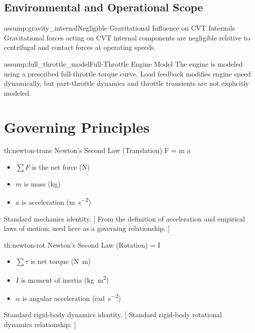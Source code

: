 \documentclass[11pt]{article}
\numberwithin{equation}{section}
\newcounter{theory}
\newcounter{assump}
\begin{document}
\subsection{Environmental and Operational Scope}

\begin{assumptionblock}{assump:gravity_internal}{Negligible Gravitational Influence on CVT Internals}
Gravitational forces acting on CVT internal components
are negligible relative to centrifugal and contact forces
at operating speeds.
\end{assumptionblock}

\begin{assumptionblock}{assump:full_throttle_model}{Full-Throttle Engine Model}
The engine is modeled using a prescribed full-throttle torque curve.
Load feedback modifies engine speed dynamically,
but part-throttle dynamics and throttle transients
are not explicitly modeled.
\end{assumptionblock}


\section{Governing Principles}\label{sec:principles}

%


\theory
{th:newton-trans}
{Newton's Second Law (Translation)}
{\sum F = m a}
{
\begin{itemize}
  \item $\sum F$ is the net force (\si{\newton})
  \item $m$ is mass (\si{\kilogram})
  \item $a$ is acceleration (\si{\meter\per\second\squared})
\end{itemize}
}
{Standard mechanics identity.}
[
From the definition of acceleration and empirical laws of motion; used here as a governing relationship.
]

\theory
{th:newton-rot}
{Newton's Second Law (Rotation)}
{\sum \tau = I \alpha}
{
\begin{itemize}
  \item $\sum \tau$ is net torque (\si{\newton\meter})
  \item $I$ is moment of inertia (\si{\kilogram\meter\squared})
  \item $\alpha$ is angular acceleration (\si{\radian\per\second\squared})
\end{itemize}
}
{Standard rigid-body dynamics identity.}
[
Standard rigid-body rotational dynamics relationship.
]
\end{document}
